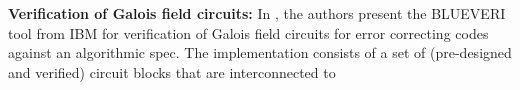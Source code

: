 
{\bf Verification of Galois field circuits:} 
In %
\cite{ibm:blueveri},
the authors present the {\sc BLUEVERI} tool from IBM for verification
of Galois field circuits for error correcting codes against an
algorithmic spec. The implementation consists of a set of
(pre-designed and verified) circuit blocks that are interconnected to
